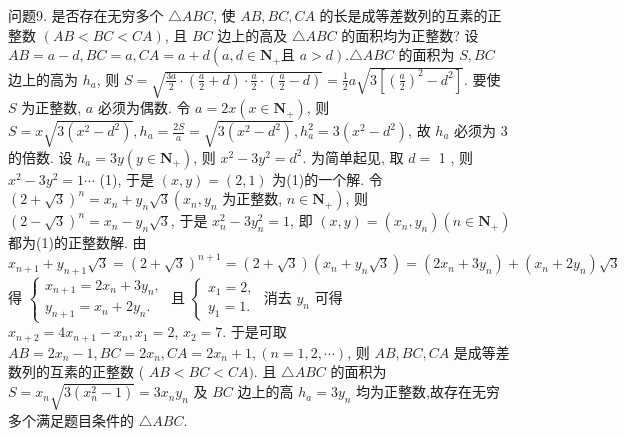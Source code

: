 问题9. 是否存在无穷多个 $\triangle A B C$, 使 $A B, B C, C A$ 的长是成等差数列的互素的正整数 $(A B<B C<C A)$, 且 $B C$ 边上的高及 $\triangle A B C$ 的面积均为正整数?
设 $A B=a-d, B C=a, C A=a+d\left(a, d \in \mathbf{N}_{+}\right.$且 $\left.a>d\right) . \triangle A B C$ 的面积为 $S, B C$ 边上的高为 $h_a$, 则 $S=\sqrt{\frac{3 a}{2} \cdot\left(\frac{a}{2}+d\right) \cdot \frac{a}{2} \cdot\left(\frac{a}{2}-d\right)}= \frac{1}{2} a \sqrt{3\left[\left(\frac{a}{2}\right)^2-d^2\right]}$. 要使 $S$ 为正整数, $a$ 必须为偶数.
令 $a=2 x\left(x \in \mathbf{N}_{+}\right)$, 则 $S=x \sqrt{3\left(x^2-d^2\right)}, h_a=\frac{2 S}{a}=\sqrt{3\left(x^2-d^2\right)}, h_a^2=3\left(x^2-d^2\right)$, 故 $h_a$ 必须为 3 的倍数.
设 $h_a=3 y\left(y \in \mathbf{N}_{+}\right)$, 则 $x^2-3 y^2=d^2$. 为简单起见, 取 $d=$ 1 , 则 $x^2-3 y^2=1 \cdots$ (1), 于是 $(x, y)=(2,1)$ 为(1)的一个解.
令 $(2+\sqrt{3})^n= x_n+y_n \sqrt{3}\left(x_n, y_n\right.$ 为正整数, $\left.n \in \mathbf{N}_{+}\right)$, 则 $(2-\sqrt{3})^n=x_n-y_n \sqrt{3}$, 于是 $x_n^2- 3 y_n^2=1$, 即 $(x, y)=\left(x_n, y_n\right)\left(n \in \mathbf{N}_{+}\right)$都为(1)的正整数解.
由 $x_{n+1}+y_{n+1} \sqrt{3}=(2+\sqrt{3})^{n+1}=(2+\sqrt{3})\left(x_n+y_n \sqrt{3}\right)=\left(2 x_n+3 y_n\right)+\left(x_n+2 y_n\right) \sqrt{3}$ 得 $\left\{\begin{array}{l}x_{n+1}=2 x_n+3 y_n, \\ y_{n+1}=x_n+2 y_n .\end{array}\right.$ 且 $\left\{\begin{array}{l}x_1=2, \\ y_1=1 .\end{array}\right.$ 消去 $y_n$ 可得 $x_{n+2}=4 x_{n+1}-x_n, x_1=2$, $x_2=7$. 于是可取 $A B=2 x_n-1, B C=2 x_n, C A=2 x_n+1,(n=1,2, \cdots)$, 则 $A B, B C, C A$ 是成等差数列的互素的正整数 ( $A B<B C<C A)$. 且 $\triangle A B C$ 的面积为 $S=x_n \sqrt{3\left(x_n^2-1\right)}=3 x_n y_n$ 及 $B C$ 边上的高 $h_a=3 y_n$ 均为正整数,故存在无穷多个满足题目条件的 $\triangle A B C$.


